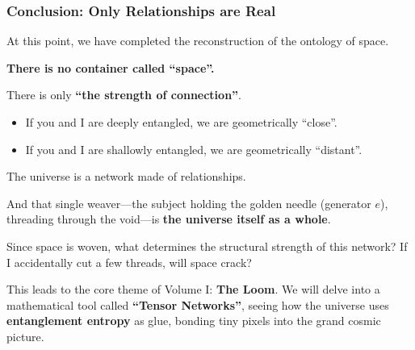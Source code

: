 \subsubsection{Conclusion: Only Relationships are Real}

At this point, we have completed the reconstruction of the ontology of space.

\textbf{There is no container called ``space''.}

There is only \textbf{``the strength of connection''}.

\begin{itemize}
\item If you and I are deeply entangled, we are geometrically ``close''.

\item If you and I are shallowly entangled, we are geometrically ``distant''.
\end{itemize}

The universe is a network made of relationships.

And that single weaver---the subject holding the golden needle (generator $e$), threading through the void---is \textbf{the universe itself as a whole}.

Since space is woven, what determines the structural strength of this network? If I accidentally cut a few threads, will space crack?

This leads to the core theme of Volume I: \textbf{The Loom}. We will delve into a mathematical tool called \textbf{``Tensor Networks''}, seeing how the universe uses \textbf{entanglement entropy} as glue, bonding tiny pixels into the grand cosmic picture.

